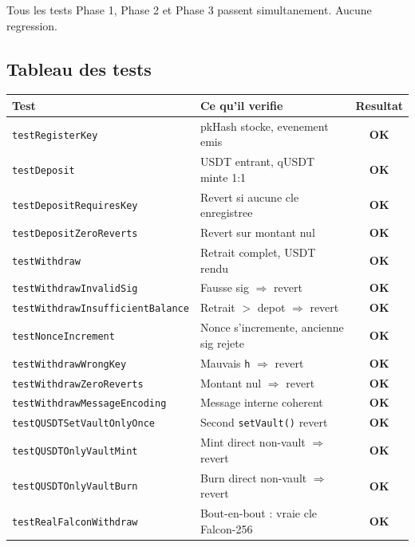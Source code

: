 \documentclass[11pt,a4paper]{article}
\begin{document}
\begin{resultbox}
Tous les tests Phase 1, Phase 2 et Phase 3 passent simultanement. Aucune regression.
\end{resultbox}

\subsection{Tableau des tests}

\begin{center}
\begin{tabular}{llc}
\toprule
\textbf{Test} & \textbf{Ce qu'il verifie} & \textbf{Resultat} \\
\midrule
\texttt{testRegisterKey}                 & pkHash stocke, evenement emis & \textcolor{pass-green}{\textbf{OK}} \\
\texttt{testDeposit}                     & USDT entrant, qUSDT minte 1:1 & \textcolor{pass-green}{\textbf{OK}} \\
\texttt{testDepositRequiresKey}          & Revert si aucune cle enregistree & \textcolor{pass-green}{\textbf{OK}} \\
\texttt{testDepositZeroReverts}          & Revert sur montant nul & \textcolor{pass-green}{\textbf{OK}} \\
\texttt{testWithdraw}                    & Retrait complet, USDT rendu & \textcolor{pass-green}{\textbf{OK}} \\
\texttt{testWithdrawInvalidSig}          & Fausse sig $\Rightarrow$ revert & \textcolor{pass-green}{\textbf{OK}} \\
\texttt{testWithdrawInsufficientBalance} & Retrait $>$ depot $\Rightarrow$ revert & \textcolor{pass-green}{\textbf{OK}} \\
\texttt{testNonceIncrement}              & Nonce s'incremente, ancienne sig rejete & \textcolor{pass-green}{\textbf{OK}} \\
\texttt{testWithdrawWrongKey}            & Mauvais \texttt{h} $\Rightarrow$ revert & \textcolor{pass-green}{\textbf{OK}} \\
\texttt{testWithdrawZeroReverts}         & Montant nul $\Rightarrow$ revert & \textcolor{pass-green}{\textbf{OK}} \\
\texttt{testWithdrawMessageEncoding}     & Message interne coherent & \textcolor{pass-green}{\textbf{OK}} \\
\texttt{testQUSDTSetVaultOnlyOnce}       & Second \texttt{setVault()} revert & \textcolor{pass-green}{\textbf{OK}} \\
\texttt{testQUSDTOnlyVaultMint}          & Mint direct non-vault $\Rightarrow$ revert & \textcolor{pass-green}{\textbf{OK}} \\
\texttt{testQUSDTOnlyVaultBurn}          & Burn direct non-vault $\Rightarrow$ revert & \textcolor{pass-green}{\textbf{OK}} \\
\midrule
\texttt{testRealFalconWithdraw}          & Bout-en-bout : vraie cle Falcon-256 & \textcolor{pass-green}{\textbf{OK}} \\
\bottomrule
\end{tabular}
\end{center}
\end{document}
